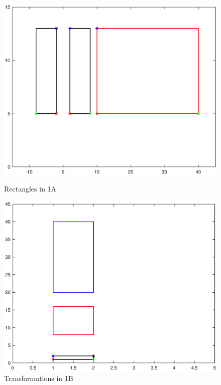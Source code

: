 \documentclass[10pt]{article}
\begin{document}
\begin{enumerate}[leftmargin=\labelsep]
    \begin{figure}[h]
        \begin{minipage}[c]{0.48\linewidth}
        \includegraphics[width=\linewidth]{Figure1.eps}
        \caption{Rectangles in 1A}
        \end{minipage}
        \hfill
        \begin{minipage}[c]{0.48\linewidth}
        \includegraphics[width=\linewidth]{Figure2.eps}
        \caption{Transformations in 1B}
        \end{minipage}%
    \end{figure}
    

\end{enumerate}
\end{document}
